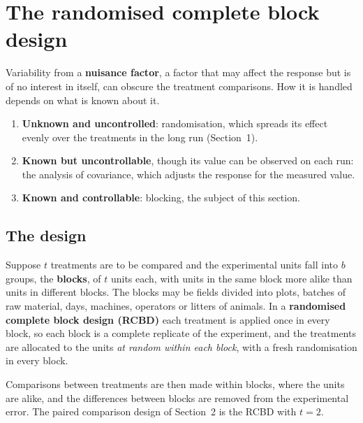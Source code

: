 \documentclass[11pt,a4paper]{article}
\numberwithin{equation}{section}
\theoremstyle{definition}
\begin{document}
\section{The randomised complete block design}
Variability from a \textbf{nuisance factor}, a factor that may affect the response but is of no interest in itself, can obscure the treatment
comparisons. How it is handled depends on what is known about it.
\begin{enumerate}[label=(\alph*)]
\item \textbf{Unknown and uncontrolled}: randomisation, which spreads its effect evenly over the treatments in the long run (Section~1).
\item \textbf{Known but uncontrollable}, though its value can be observed on each run: the analysis of covariance, which adjusts the response for
the measured value.
\item \textbf{Known and controllable}: blocking, the subject of this section.
\end{enumerate}

\subsection{The design}
Suppose $t$ treatments are to be compared and the experimental units fall into $b$ groups, the \textbf{blocks}, of $t$ units each, with units in the same
block more alike than units in different blocks. The blocks may be fields divided into plots, batches of raw material, days, machines, operators or
litters of animals. In a \textbf{randomised complete block design (RCBD)} each treatment is applied once in every block, so each block is a complete
replicate of the experiment, and the treatments are allocated to the units \emph{at random within each block}, with a fresh randomisation in every
block.

Comparisons between treatments are then made within blocks, where the units are alike, and the differences between blocks are removed
from the experimental error. The paired comparison design of Section~2 is the RCBD with $t = 2$.
\end{document}
